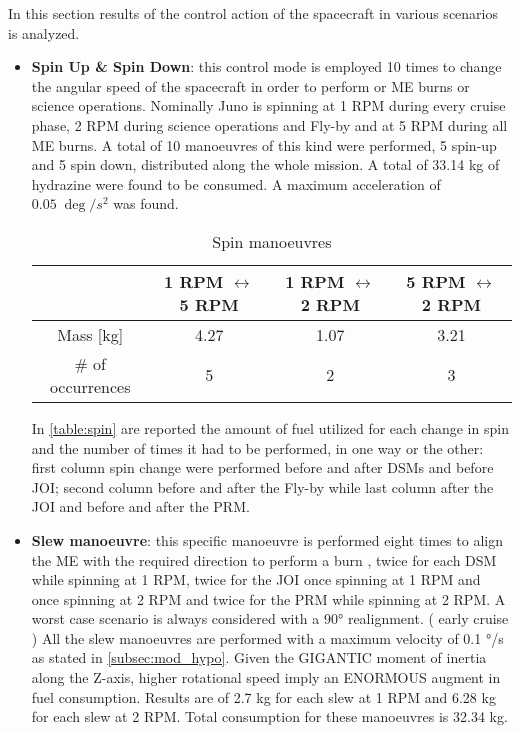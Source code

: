 In this section results of the control action of the spacecraft in various scenarios is analyzed.

\begin{itemize}
    \item \textbf{Spin Up \& Spin Down}: this control mode is employed 10 times to change the angular speed of the spacecraft in order to perform or ME burns or science operations. Nominally Juno is spinning at 1 RPM during every cruise phase, 2 RPM during science operations and Fly-by and at 5 RPM during all ME burns. A total of 10 manoeuvres of this kind were performed, 5 spin-up and 5 spin down, distributed along the whole mission.  A total of 33.14 kg of hydrazine were found to be consumed. A maximum acceleration of $0.05 \; \deg /s^2$ was found. 
    
    \begin{table}[H]
        \renewcommand{\arraystretch}{1.3}
        \centering
        \begin{tabular}{|c|c|c|c|}
            \hline
            &\textbf{1 RPM $\leftrightarrow$ 5 RPM } & \textbf{1 RPM $\leftrightarrow$ 2 RPM } &\textbf{5 RPM $\leftrightarrow$ 2 RPM }\\
            \hline
            \hline
            Mass [kg] & 4.27 & 1.07 & 3.21 \\
            \hline
            \# of occurrences & 5 & 2 & 3 \\
            \hline
        \end{tabular}
        \caption{Spin manoeuvres}
        \label{table:spin}
    \end{table}

    In \autoref{table:spin} are reported the amount of fuel utilized for each change in spin and the number of times it had to be performed, in one way or the other: first column spin change were performed before and after DSMs and before JOI; second column before and after the Fly-by while last column after the JOI and before and after the PRM. 

    \item \textbf{Slew manoeuvre}: this specific manoeuvre is performed eight times to align the ME with the required direction to perform a burn \mref, twice for each DSM while spinning at 1 RPM, twice for the JOI once spinning at 1 RPM and once spinning at 2 RPM and twice for the PRM while spinning at 2 RPM. A worst case scenario is always considered with a 90° realignment. \mref ( early cruise )  
    All the slew manoeuvres are performed with a maximum velocity of 0.1 °/s as stated in \autoref{subsec:mod_hypo}. 
    Given the GIGANTIC moment of inertia along the Z-axis, higher rotational speed imply an ENORMOUS augment in fuel consumption. Results are of 2.7 kg for each slew at 1 RPM and 6.28 kg for each slew at 2 RPM.  Total consumption for these manoeuvres is 32.34 kg. 
    

\end{itemize}
